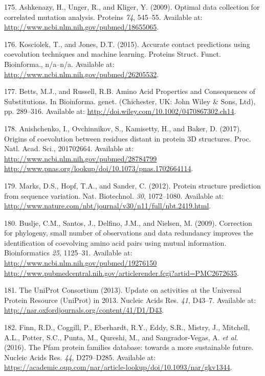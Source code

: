 \documentclass[11pt,a4paper,twoside]{book}
\theoremstyle{definition}
\theoremstyle{definition}
\theoremstyle{remark}
\begin{document}
\hypertarget{ref-Ashkenazy2009}{}
175. Ashkenazy, H., Unger, R., and Kliger, Y. (2009). Optimal data
collection for correlated mutation analysis. Proteins \emph{74},
545--55. Available at:
\url{http://www.ncbi.nlm.nih.gov/pubmed/18655065}.

\hypertarget{ref-Kosciolek2015a}{}
176. Kosciolek, T., and Jones, D.T. (2015). Accurate contact predictions
using coevolution techniques and machine learning. Proteins Struct.
Funct. Bioinforma., n/a--n/a. Available at:
\url{http://www.ncbi.nlm.nih.gov/pubmed/26205532}.

\hypertarget{ref-Bettsa}{}
177. Betts, M.J., and Russell, R.B. Amino Acid Properties and
Consequences of Substitutions. In Bioinforma. genet. (Chichester, UK:
John Wiley \& Sons, Ltd), pp. 289--316. Available at:
\url{http://doi.wiley.com/10.1002/0470867302.ch14}.

\hypertarget{ref-Anishchenko2017}{}
178. Anishchenko, I., Ovchinnikov, S., Kamisetty, H., and Baker, D.
(2017). Origins of coevolution between residues distant in protein 3D
structures. Proc. Natl. Acad. Sci., 201702664. Available at:
\href{http://www.ncbi.nlm.nih.gov/pubmed/28784799\%20http://www.pnas.org/lookup/doi/10.1073/pnas.1702664114}{http://www.ncbi.nlm.nih.gov/pubmed/28784799 http://www.pnas.org/lookup/doi/10.1073/pnas.1702664114}.

\hypertarget{ref-Marks2012}{}
179. Marks, D.S., Hopf, T.A., and Sander, C. (2012). Protein structure
prediction from sequence variation. Nat. Biotechnol. \emph{30},
1072--1080. Available at:
\url{http://www.nature.com/nbt/journal/v30/n11/full/nbt.2419.html}.

\hypertarget{ref-Buslje2009}{}
180. Buslje, C.M., Santos, J., Delfino, J.M., and Nielsen, M. (2009).
Correction for phylogeny, small number of observations and data
redundancy improves the identification of coevolving amino acid pairs
using mutual information. Bioinformatics \emph{25}, 1125--31. Available
at:
\href{http://www.ncbi.nlm.nih.gov/pubmed/19276150\%20http://www.pubmedcentral.nih.gov/articlerender.fcgi?artid=PMC2672635}{http://www.ncbi.nlm.nih.gov/pubmed/19276150 http://www.pubmedcentral.nih.gov/articlerender.fcgi?artid=PMC2672635}.

\hypertarget{ref-TheUniProtConsortium2013}{}
181. The UniProt Consortium (2013). Update on activities at the
Universal Protein Resource (UniProt) in 2013. Nucleic Acids Res.
\emph{41}, D43--7. Available at:
\url{http://nar.oxfordjournals.org/content/41/D1/D43}.

\hypertarget{ref-Finn2016}{}
182. Finn, R.D., Coggill, P., Eberhardt, R.Y., Eddy, S.R., Mistry, J.,
Mitchell, A.L., Potter, S.C., Punta, M., Qureshi, M., and
Sangrador-Vegas, A. \emph{et al.} (2016). The Pfam protein families
database: towards a more sustainable future. Nucleic Acids Res.
\emph{44}, D279--D285. Available at:
\url{https://academic.oup.com/nar/article-lookup/doi/10.1093/nar/gkv1344}.
\end{document}
